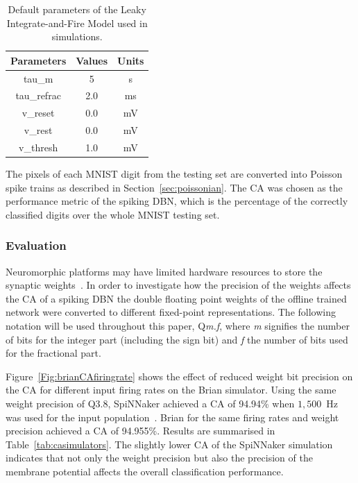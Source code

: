 \documentclass{frontiersENG} %
\begin{document}
\begin{table}[hbbp]
	\centering
	\caption{\label{Tab:NeuralParams}Default parameters of the Leaky Integrate-and-Fire Model used in simulations.}
	\bgroup
	\def\arraystretch{1.3}
	\begin{tabular}{c c c}
		Parameters & Values & Units \\
		\hline
		tau\_m & 5 & s\\
		tau\_refrac & 2.0 & ms\\
		v\_reset & 0.0 & mV\\
		v\_rest & 0.0 & mV\\
		v\_thresh & 1.0 & mV\\
	\end{tabular}
	\egroup
\end{table}

The pixels of each MNIST digit from the testing set are converted into Poisson spike trains as described in Section~\ref{sec:poissonian}. %
The CA was chosen as the performance metric of the spiking DBN, which is the percentage of the correctly classified digits over the whole MNIST testing set.

\subsubsection{Evaluation}
Neuromorphic platforms may have limited hardware resources to store the synaptic weights~\citep{schemmel2010wafer,merolla2014million}. In order to investigate how the precision of the weights affects the CA of a spiking DBN the double floating point weights of the offline trained network were converted to different fixed-point representations. The following notation will be used throughout this paper, Q\textit{m.f}, where \textit{m} signifies the number of bits for the integer part (including the sign bit) and \textit{f} the number of bits used for the fractional part.

Figure~\ref{Fig:brianCAfiringrate} shows the effect of reduced weight bit precision on the CA for different input firing rates on the Brian simulator.
Using the same weight precision of Q3.8, SpiNNaker achieved a CA of 94.94\% when $1,500$~Hz was used for the input population~\citep{Stromatias2015scalable}. Brian for the same firing rates and weight precision achieved a CA of 94.955\%. Results are summarised in Table~\ref{tab:casimulators}.
The slightly lower CA of the SpiNNaker simulation indicates that not only the weight precision but also the precision of the membrane potential affects the overall classification performance.    
\end{document}
